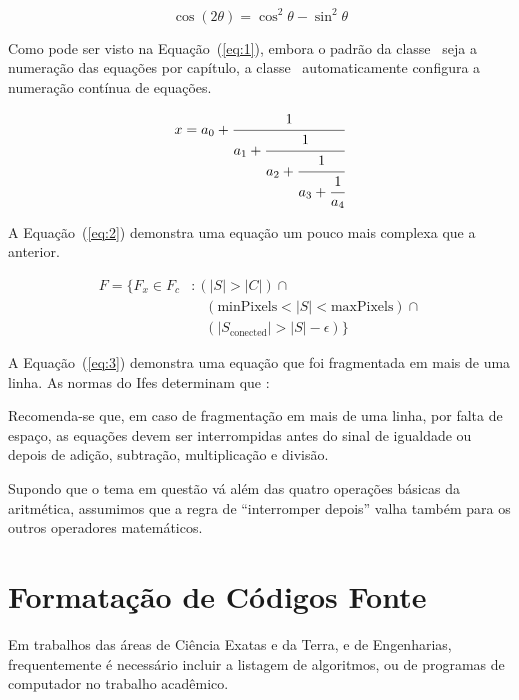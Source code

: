 \documentclass[times,english,brazilian,oneside,section=TITLE]{ifes8}
\begin{document}
\begin{equation}
  \label{eq:1}
  \cos (2\theta) = \cos^2 \theta - \sin^2 \theta
\end{equation}

Como pode ser visto na Equação~(\ref{eq:1}), embora o padrão da classe
\abnTeX\ seja a numeração das equações por capítulo, a classe
\ifestex\ automaticamente configura a numeração contínua de equações.

\begin{equation}
  \label{eq:2}
  x = a_0 + \cfrac{1}{a_1 
    + \cfrac{1}{a_2 
      + \cfrac{1}{a_3 + \cfrac{1}{a_4}}}}
\end{equation}

A Equação~(\ref{eq:2}) demonstra uma equação um pouco mais complexa
que a anterior.

\begin{equation}
  \label{eq:3}
  \begin{split}
    F = \{F_{x} \in  F_{c} &: (|S| > |C|) \cap {}\\
    &\quad (\text{minPixels}  < |S| < \text{maxPixels}) \cap {} \\
    &\quad (|S_{\text{conected}}| > |S| - \epsilon) \}
  \end{split}
\end{equation}

A Equação~(\ref{eq:3}) demonstra uma equação que foi fragmentada em
mais de uma linha. As normas do Ifes determinam que
\cite[p.~38]{Ifes2024}:

\begin{citacao}
  Recomenda-se que, em caso de fragmentação em mais de uma linha, por
  falta de espaço, as equações devem ser interrompidas antes do sinal
  de igualdade ou depois de adição, subtração, multiplicação e
  divisão.
\end{citacao}

Supondo que o tema em questão vá além das quatro operações básicas da
aritmética, assumimos que a regra de ``interromper depois'' valha
também para os outros operadores matemáticos.


\section{Formatação de Códigos Fonte}

Em trabalhos das áreas de Ciência Exatas e da Terra, e de Engenharias,
frequentemente é necessário incluir a listagem de algoritmos, ou de programas de
computador no trabalho acadêmico.
\end{document}
